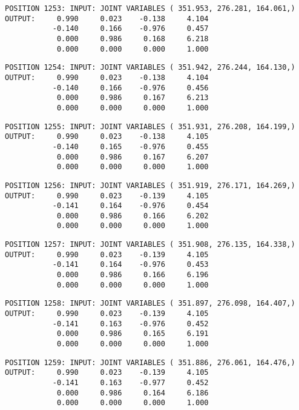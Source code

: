 \begin{verbatim}
POSITION 1253: INPUT: JOINT VARIABLES ( 351.953, 276.281, 164.061,)
OUTPUT:     0.990     0.023    -0.138     4.104
           -0.140     0.166    -0.976     0.457
            0.000     0.986     0.168     6.218
            0.000     0.000     0.000     1.000
\end{verbatim} \pagebreak[1]\begin{verbatim}
POSITION 1254: INPUT: JOINT VARIABLES ( 351.942, 276.244, 164.130,)
OUTPUT:     0.990     0.023    -0.138     4.104
           -0.140     0.166    -0.976     0.456
            0.000     0.986     0.167     6.213
            0.000     0.000     0.000     1.000
\end{verbatim} \pagebreak[1]\begin{verbatim}
POSITION 1255: INPUT: JOINT VARIABLES ( 351.931, 276.208, 164.199,)
OUTPUT:     0.990     0.023    -0.138     4.105
           -0.140     0.165    -0.976     0.455
            0.000     0.986     0.167     6.207
            0.000     0.000     0.000     1.000
\end{verbatim} \pagebreak[1]\begin{verbatim}
POSITION 1256: INPUT: JOINT VARIABLES ( 351.919, 276.171, 164.269,)
OUTPUT:     0.990     0.023    -0.139     4.105
           -0.141     0.164    -0.976     0.454
            0.000     0.986     0.166     6.202
            0.000     0.000     0.000     1.000
\end{verbatim} \pagebreak[1]\begin{verbatim}
POSITION 1257: INPUT: JOINT VARIABLES ( 351.908, 276.135, 164.338,)
OUTPUT:     0.990     0.023    -0.139     4.105
           -0.141     0.164    -0.976     0.453
            0.000     0.986     0.166     6.196
            0.000     0.000     0.000     1.000
\end{verbatim} \pagebreak[1]\begin{verbatim}
POSITION 1258: INPUT: JOINT VARIABLES ( 351.897, 276.098, 164.407,)
OUTPUT:     0.990     0.023    -0.139     4.105
           -0.141     0.163    -0.976     0.452
            0.000     0.986     0.165     6.191
            0.000     0.000     0.000     1.000
\end{verbatim} \pagebreak[1]\begin{verbatim}
POSITION 1259: INPUT: JOINT VARIABLES ( 351.886, 276.061, 164.476,)
OUTPUT:     0.990     0.023    -0.139     4.105
           -0.141     0.163    -0.977     0.452
            0.000     0.986     0.164     6.186
            0.000     0.000     0.000     1.000
\end{verbatim} \pagebreak[1]\begin{verbatim}

\end{verbatim}
